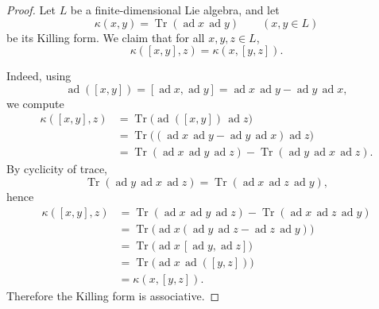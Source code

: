 \begin{proof}
    Let $L$ be a finite-dimensional Lie algebra, and let
    \[
        \kappa(x,y)=\operatorname{Tr}(\operatorname{ad}x\,\operatorname{ad}y)
        \qquad (x,y\in L)
    \]
    be its Killing form. We claim that for all $x,y,z\in L$,
    \[
        \kappa([x,y],z)=\kappa(x,[y,z]).
    \]

    Indeed, using
    \[
        \operatorname{ad}([x,y])=[\operatorname{ad}x,\operatorname{ad}y]
        =\operatorname{ad}x\,\operatorname{ad}y-\operatorname{ad}y\,\operatorname{ad}x,
    \]
    we compute
    \begin{align*}
        \kappa([x,y],z)
         & =\operatorname{Tr}\bigl(\operatorname{ad}([x,y])\,\operatorname{ad}z\bigr)                                                      \\
         & =\operatorname{Tr}\bigl((\operatorname{ad}x\,\operatorname{ad}y-\operatorname{ad}y\,\operatorname{ad}x)\operatorname{ad}z\bigr) \\
         & =\operatorname{Tr}(\operatorname{ad}x\,\operatorname{ad}y\,\operatorname{ad}z)
        -\operatorname{Tr}(\operatorname{ad}y\,\operatorname{ad}x\,\operatorname{ad}z).
    \end{align*}
    By cyclicity of trace,
    \[
        \operatorname{Tr}(\operatorname{ad}y\,\operatorname{ad}x\,\operatorname{ad}z)
        =\operatorname{Tr}(\operatorname{ad}x\,\operatorname{ad}z\,\operatorname{ad}y),
    \]
    hence
    \begin{align*}
        \kappa([x,y],z)
         & =\operatorname{Tr}(\operatorname{ad}x\,\operatorname{ad}y\,\operatorname{ad}z)
        -\operatorname{Tr}(\operatorname{ad}x\,\operatorname{ad}z\,\operatorname{ad}y)                                                     \\
         & =\operatorname{Tr}\bigl(\operatorname{ad}x(\operatorname{ad}y\,\operatorname{ad}z-\operatorname{ad}z\,\operatorname{ad}y)\bigr) \\
         & =\operatorname{Tr}\bigl(\operatorname{ad}x\,[\operatorname{ad}y,\operatorname{ad}z]\bigr)                                       \\
         & =\operatorname{Tr}\bigl(\operatorname{ad}x\,\operatorname{ad}([y,z])\bigr)                                                      \\
         & =\kappa(x,[y,z]).
    \end{align*}
    Therefore the Killing form is associative.
\end{proof}

